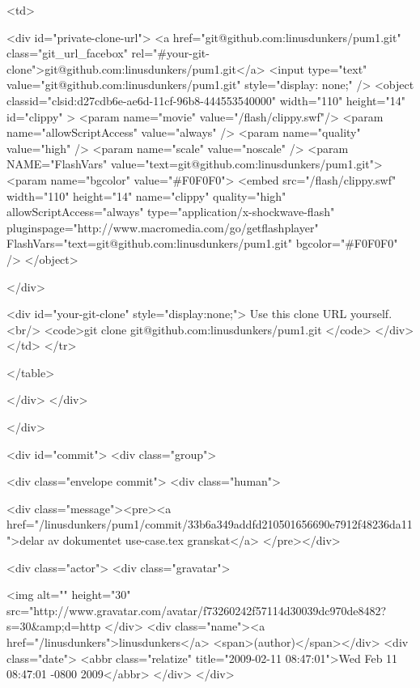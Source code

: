             <td>

              <div id="private-clone-url">
                <a href="git@github.com:linusdunkers/pum1.git" class="git_url_facebox" rel="#your-git-clone">git@github.com:linusdunkers/pum1.git</a>
                <input type="text" value="git@github.com:linusdunkers/pum1.git" style="display: none;" />
                      <object classid="clsid:d27cdb6e-ae6d-11cf-96b8-444553540000"
              width="110"
              height="14"
              id="clippy" >
      <param name="movie" value="/flash/clippy.swf"/>
      <param name="allowScriptAccess" value="always" />
      <param name="quality" value="high" />
      <param name="scale" value="noscale" />
      <param NAME="FlashVars" value="text=git@github.com:linusdunkers/pum1.git">
      <param name="bgcolor" value="#F0F0F0">
      <embed src="/flash/clippy.swf"
             width="110"
             height="14"
             name="clippy"
             quality="high"
             allowScriptAccess="always"
             type="application/x-shockwave-flash"
             pluginspage="http://www.macromedia.com/go/getflashplayer"
             FlashVars="text=git@github.com:linusdunkers/pum1.git"
             bgcolor="#F0F0F0"
      />
      </object>

              </div>

              <div id="your-git-clone" style="display:none;">
                Use this clone URL yourself.
                <br/>
                <code>git clone git@github.com:linusdunkers/pum1.git </code>
              </div>
            </td>
          </tr>
          
          

          

          
      </table>

          </div>
  </div>




</div>


  <div id="commit">
    <div class="group">
        
  <div class="envelope commit">
    <div class="human">
      
        <div class="message"><pre><a href="/linusdunkers/pum1/commit/33b6a349addfd210501656690e7912f48236da11">delar av dokumentet use-case.tex granskat</a> </pre></div>
      

      <div class="actor">
        <div class="gravatar">
          
          <img alt="" height="30" src="http://www.gravatar.com/avatar/f73260242f57114d30039dc970de8482?s=30&amp;d=http%
        </div>
        <div class="name"><a href="/linusdunkers">linusdunkers</a> <span>(author)</span></div>
          <div class="date">
            <abbr class="relatize" title="2009-02-11 08:47:01">Wed Feb 11 08:47:01 -0800 2009</abbr> 
          </div>
      </div>
  
